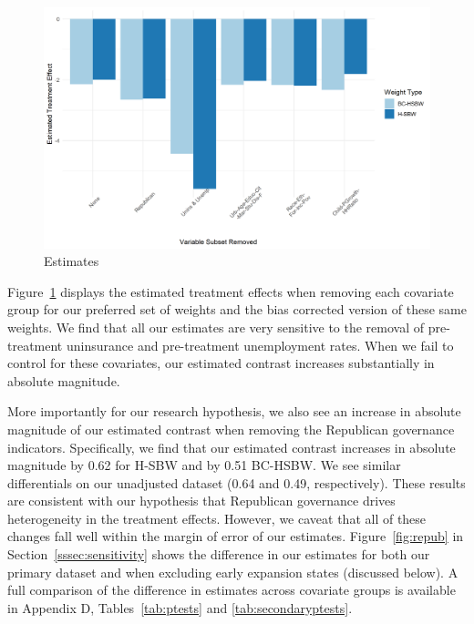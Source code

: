 \documentclass[12pt]{article}
\begin{document}
\begin{figure}[]
\begin{center}
    \includegraphics[scale=0.6]{01_Plots/loo-covariates-main-c1.png}
    \caption{Estimates}
    \label{fig:loocovariates}
\end{center}
\end{figure}

Figure~\ref{fig:loocovariates} displays the estimated treatment effects when removing each covariate group for our preferred set of weights and the bias corrected version of these same weights. We find that all our estimates are very sensitive to the removal of pre-treatment uninsurance and pre-treatment unemployment rates. When we fail to control for these covariates, our estimated contrast increases substantially in absolute magnitude.  

More importantly for our research hypothesis, we also see an increase in absolute magnitude of our estimated contrast when removing the Republican governance indicators. Specifically, we find that our estimated contrast increases in absolute magnitude by 0.62 for H-SBW and by 0.51 BC-HSBW. We see similar differentials on our unadjusted dataset (0.64 and 0.49, respectively). These results are consistent with our hypothesis that Republican governance drives heterogeneity in the treatment effects. However, we caveat that all of these changes fall well within the margin of error of our estimates. Figure~\ref{fig:repub} in Section~\ref{sssec:sensitivity} shows the difference in our estimates for both our primary dataset and when excluding early expansion states (discussed below). A full comparison of the difference in estimates across covariate groups is available in Appendix D, Tables~\ref{tab:ptests} and \ref{tab:secondaryptests}.
\end{document}
